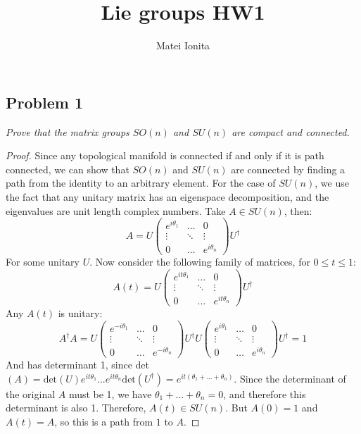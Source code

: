 \documentclass[12 pt]{article}
\title{Lie groups HW1}
\author{Matei Ionita}
\begin{document}
  \maketitle

\subsection*{Problem 1}
\emph{Prove that the matrix groups $SO(n)$ and $SU(n)$ are compact and connected.}

\begin{proof}
Since any topological manifold is connected if and only if it is path connected, we can show that $SO(n)$ and $SU(n)$ are connected by finding a path from the identity to an arbitrary element. For the case of $SU(n)$, we use the fact that any unitary matrix has an eigenspace decomposition, and the eigenvalues are unit length complex numbers. Take $A\in SU(n)$, then:
\[     A = U  \left(  \begin{array} {ccc}  e^{i\theta_1} & \dots & 0  \\ \vdots & \ddots & \vdots \\ 0 & \dots & e^{i\theta_n}  \end{array} \right) U^{\dagger}     \]
For some unitary $U$. Now consider the following family of matrices, for $0\leq t \leq 1$:
\[     A(t) = U  \left(  \begin{array} {ccc}  e^{it\theta_1} & \dots & 0  \\ \vdots & \ddots & \vdots \\ 0 & \dots & e^{it\theta_n}  \end{array} \right) U^{\dagger}      \]
Any $A(t)$ is unitary:
\[     A^{\dagger}A = U   \left(   \begin{array} {ccc}  e^{-i\theta_1} & \dots & 0  \\ \vdots & \ddots & \vdots \\ 0 & \dots & e^{-i\theta_n}  \end{array} \right) U^{\dagger} U   \left(   \begin{array} {ccc}  e^{i\theta_1} & \dots & 0  \\ \vdots & \ddots & \vdots \\ 0 & \dots & e^{i\theta_n}  \end{array} \right) U^{\dagger} = 1    \]
And has determinant 1, since det$(A) = \text{det}(U) e^{it\theta_1} ... e^{it\theta_n} \text{det}(U^{\dagger}) = e^{it(\theta_1 + ... +\theta_n)}$. Since the determinant of the original $A$ must be 1, we have $\theta_1 + ... + \theta_n = 0$, and therefore this determinant is also 1. Therefore, $A(t) \in SU(n)$. But $A(0) = 1$ and $A(t) = A$, so this is a path from $1$ to $A$.

\end{proof}
\end{document}

